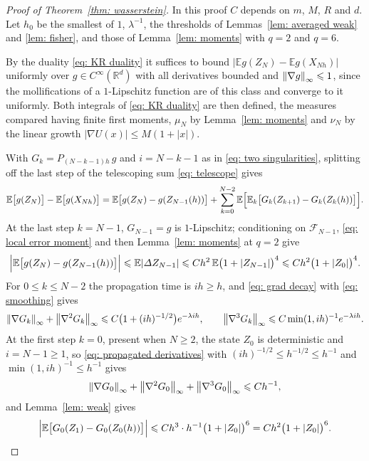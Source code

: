 \documentclass[namedate,webpdf,imanum]{ima-authoring-template}
\newcommand{\Le}{\leqslant}
\newcommand{\Ge}{\geqslant}
\theoremstyle{thmstyletwo}
\numberwithin{equation}{section}
\begin{document}
\begin{proof}[Proof of Theorem~\ref{thm: wasserstein}]
    In this proof $C$ depends on $m$, $M$, $R$ and $d$. Let $h_0$ be the smallest of $1$, $\lambda^{-1}$, the thresholds of Lemmas~\ref{lem: averaged weak} and \ref{lem: fisher}, and those of Lemma~\ref{lem: moments} with $q = 2$ and $q = 6$.

    By the duality \eqref{eq: KR duality} it suffices to bound $|\mathbb E g(Z_N) - \mathbb E g(X_{Nh})|$ uniformly over $g \in C^\infty(\mathbb R^d)$ with all derivatives bounded and $\norm{\nabla g}_\infty \Le 1$, since the mollifications of a $1$-Lipschitz function are of this class and converge to it uniformly. Both integrals of \eqref{eq: KR duality} are then defined, the measures compared having finite first moments, $\mu_N$ by Lemma~\ref{lem: moments} and $\nu_N$ by the linear growth $|\nabla U(x)| \Le M(1+|x|)$.

    With $G_k = P_{(N-k-1)h}\, g$ and $i = N-k-1$ as in \eqref{eq: two singularities}, splitting off the last step of the telescoping sum \eqref{eq: telescope} gives
    \begin{equation}
        \mathbb E \bigl[ g(Z_N) \bigr] - \mathbb E \bigl[ g(X_{Nh}) \bigr]
        = \mathbb E \bigl[ g(Z_N) - g(Z_{N-1}(h)) \bigr]
        + \sum_{k=0}^{N-2} \mathbb E \Bigl[ \mathbb E_k \bigl[ G_k(Z_{k+1}) - G_k(Z_k(h)) \bigr] \Bigr] .
        \label{eq: telescope split}
    \end{equation}
    At the last step $k = N-1$, $G_{N-1} = g$ is $1$-Lipschitz; conditioning on $\mathcal F_{N-1}$, \eqref{eq: local error moment} and then Lemma~\ref{lem: moments} at $q = 2$ give
    \begin{equation}
        \Bigl| \mathbb E \bigl[ g(Z_N) - g(Z_{N-1}(h)) \bigr] \Bigr|
        \Le \mathbb E |\Delta Z_{N-1}| \Le C h^2\, \mathbb E \bigl( 1 + |Z_{N-1}| \bigr)^{4} \Le C h^2 \bigl( 1 + |Z_0| \bigr)^{4} .
        \label{estimate: last step}
    \end{equation}
    For $0 \Le k \Le N-2$ the propagation time is $ih \Ge h$, and \eqref{eq: grad decay} with \eqref{eq: smoothing} gives
    \begin{equation}
        \norm{\nabla G_k}_\infty + \norm{\nabla^2 G_k}_\infty \Le C \bigl( 1 + (ih)^{-1/2} \bigr) e^{-\lambda i h} , \qquad
        \norm{\nabla^3 G_k}_\infty \Le C \min(1, ih)^{-1} e^{-\lambda i h} .
        \label{eq: propagated derivatives}
    \end{equation}
    At the first step $k = 0$, present when $N \Ge 2$, the state $Z_0$ is deterministic and $i = N - 1 \Ge 1$, so \eqref{eq: propagated derivatives} with $(ih)^{-1/2} \Le h^{-1/2} \Le h^{-1}$ and $\min(1, ih)^{-1} \Le h^{-1}$ gives
    \begin{equation*}
        \norm{\nabla G_0}_\infty + \norm{\nabla^2 G_0}_\infty + \norm{\nabla^3 G_0}_\infty \Le C h^{-1} ,
    \end{equation*}
    and Lemma~\ref{lem: weak} gives
    \begin{equation}
        \Bigl| \mathbb E \bigl[ G_0(Z_1) - G_0(Z_0(h)) \bigr] \Bigr| \Le C h^3 \cdot h^{-1} \bigl( 1 + |Z_0| \bigr)^{6} = C h^2 \bigl( 1 + |Z_0| \bigr)^{6} .
        \label{estimate: first step}
    \end{equation}


\end{proof}
\end{document}

